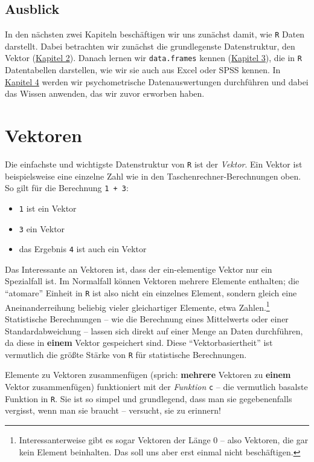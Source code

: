 \documentclass[12pt,]{tufte-book}
\providecommand{\tightlist}{%
  \setlength{\itemsep}{0pt}\setlength{\parskip}{0pt}}
\theoremstyle{definition}
\theoremstyle{definition}
\theoremstyle{definition}
\theoremstyle{remark}
\begin{document}
\section{Ausblick}\label{ausblick}

In den nächsten zwei Kapiteln beschäftigen wir uns zunächst damit, wie
\texttt{R} Daten darstellt. Dabei betrachten wir zunächst die
grundlegenste Datenstruktur, den Vektor
(\protect\hyperlink{vektoren}{Kapitel 2}). Danach lernen wir
\texttt{data.frames} kennen (\protect\hyperlink{dataframes}{Kapitel 3}),
die in \texttt{R} Datentabellen darstellen, wie wir sie auch aus Excel
oder SPSS kennen. In \protect\hyperlink{psychometrie}{Kapitel 4} werden
wir psychometrische Datenauswertungen durchführen und dabei das Wissen
anwenden, das wir zuvor erworben haben.

\hypertarget{vektoren}{\chapter{Vektoren}\label{vektoren}}

Die einfachste und wichtigste Datenstruktur von \texttt{R} ist der
\emph{Vektor}. Ein Vektor ist beispielsweise eine einzelne Zahl wie in
den Taschenrechner-Berechnungen oben. So gilt für die Berechnung
\texttt{1\ +\ 3}:

\begin{itemize}
\tightlist
\item
  \texttt{1} ist ein Vektor
\item
  \texttt{3} ein Vektor
\item
  das Ergebnis \texttt{4} ist auch ein Vektor
\end{itemize}

Das Interessante an Vektoren ist, dass der ein-elementige Vektor nur ein
Spezialfall ist. Im Normalfall können Vektoren mehrere Elemente
enthalten; die ``atomare'' Einheit in \texttt{R} ist also nicht ein
einzelnes Element, sondern gleich eine Aneinanderreihung beliebig vieler
gleichartiger Elemente, etwa Zahlen.\footnote{Interessanterweise gibt es
  sogar Vektoren der Länge 0 -- also Vektoren, die gar kein Element
  beinhalten. Das soll uns aber erst einmal nicht beschäftigen.}
Statistische Berechnungen -- wie die Berechnung eines Mittelwerts oder
einer Standardabweichung -- lassen sich direkt auf einer Menge an Daten
durchführen, da diese in \textbf{einem} Vektor gespeichert sind. Diese
``Vektorbasiertheit'' ist vermutlich die größte Stärke von \texttt{R}
für statistische Berechnungen.

Elemente zu Vektoren zusammenfügen (sprich: \textbf{mehrere} Vektoren zu
\textbf{einem} Vektor zusammenfügen) funktioniert mit der
\emph{Funktion} \texttt{c} -- die vermutlich basalste Funktion in
\texttt{R}. Sie ist so simpel und grundlegend, dass man sie
gegebenenfalls vergisst, wenn man sie braucht -- versucht, sie zu
erinnern!
\end{document}
